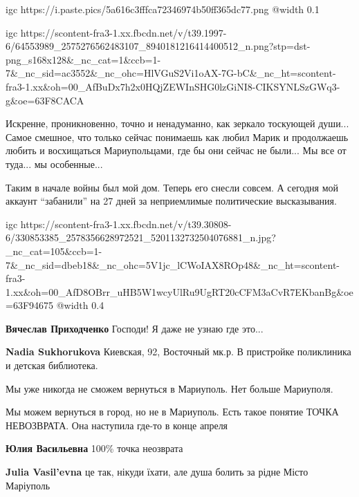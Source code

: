 
\ifcmt
  igc https://i.paste.pics/5a616c3fffca72346974b50ff365dc77.png
  @width 0.1
\fi


\ifcmt
  igc https://scontent-fra3-1.xx.fbcdn.net/v/t39.1997-6/64553989_2575276562483107_8940181216414400512_n.png?stp=dst-png_s168x128&_nc_cat=1&ccb=1-7&_nc_sid=ac3552&_nc_ohc=HlVGuS2Vi1oAX-7G-bC&_nc_ht=scontent-fra3-1.xx&oh=00_AfBuDx7h2x0HQjZEWInSHG0lzGiNI8-CIKSYNLSzGWq3-g&oe=63F8CACA
\fi


Искренне, проникновенно, точно и ненадуманно, как зеркало тоскующей души...
Самое смешное, что только сейчас понимаешь как любил Марик и продолжаешь любить
и восхищаться Мариупольцами, где бы они сейчас не были... Мы все от туда... мы
особенные...


Таким в начале войны был мой дом. Теперь его снесли совсем. А сегодня мой
аккаунт \enquote{забанили} на 27 дней за неприемлимые политические высказывания.

\ifcmt
  igc https://scontent-fra3-1.xx.fbcdn.net/v/t39.30808-6/330853385_2578356628972521_5201132732504076881_n.jpg?_nc_cat=105&ccb=1-7&_nc_sid=dbeb18&_nc_ohc=5V1jc_lCWoIAX8ROp48&_nc_ht=scontent-fra3-1.xx&oh=00_AfD8OBrr_uHB5W1wcyUlRu9UgRT20cCFM3aCvR7EKbanBg&oe=63F94675
	@width 0.4
\fi

\begin{itemize} %
\textbf{Вячеслав Приходченко} Господи! Я даже не узнаю где это...

\textbf{Nadia Sukhorukova} Киевская, 92, Восточный мк.р. В пристройке поликлиника и детская библиотека.
\end{itemize} %


Мы уже никогда не сможем вернуться в Мариуполь. Нет больше Мариуполя.

Мы можем вернуться в город, но не в Мариуполь. Есть такое понятие ТОЧКА
НЕВОЗВРАТА. Она наступила где-то в конце апреля

\begin{itemize} %
\textbf{Юлия Васильевна} 100\% точка неозврата

\textbf{Julia Vasil'evna} це так, нікуди їхати, але душа болить за рідне Місто Маріуполь
\end{itemize} %

